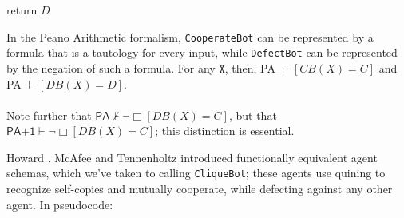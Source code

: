 \documentclass[12pt, letterpaper]{article}
\numberwithin{equation}{section}
\newenvironment{remark}[1][Remark]{\begin{trivlist}
\item[\hskip \labelsep {\bfseries #1}]}{\end{trivlist}}
\begin{document}
\begin{algorithm}[H]


 return $D$\;
 \caption{\texttt{DefectBot (DB)}}
\end{algorithm}

\begin{remark}
In the Peano Arithmetic formalism, \texttt{CooperateBot} can be represented by a formula that is a tautology for every input, while \texttt{DefectBot} can be represented by the negation of such a formula. For any $\texttt X$, then, \textsf{PA} $\vdash [CB(X)=C]$ and \textsf{PA} $\vdash [DB(X)=D]$.\\
\\
Note further that $\textsf{PA}\not\vdash \neg\Box[DB(X)=C]$, but that $\textsf{PA+1}\vdash \neg\Box [DB(X)=C]$; this distinction is essential.
\end{remark}

Howard \cite{Howard}, McAfee \cite{McAfee} and Tennenholtz \cite{Tennenholtz} introduced functionally equivalent agent schemas, which we've taken to calling \texttt{CliqueBot}; these agents use quining to recognize self-copies and mutually cooperate, while defecting against any other agent. In pseudocode:

\begin{algorithm}[H]
\label{cliquebot}


 \caption{\texttt{CliqueBot}}
\end{algorithm}
\end{document}
